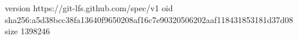 version https://git-lfs.github.com/spec/v1
oid sha256:a5d38bcc38fa13640f9650208af16c7e90320506202aaf118431853181d37d08
size 1398246
